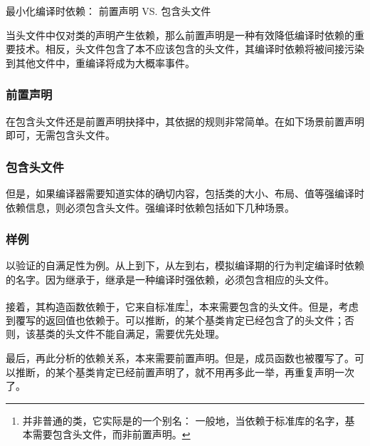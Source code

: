 \begin{content}
\begin{episode}{最小化编译时依赖： 前置声明 VS. 包含头文件}
\begin{content}
当头文件中仅对类的声明产生依赖，那么前置声明是一种有效降低编译时依赖的重要技术。相反，头文件包含了本不应该包含的头文件，其编译时依赖将被间接污染到其他文件中，重编译将成为大概率事件。

\subsubsection{前置声明}

在包含头文件还是前置声明抉择中，其依据的规则非常简单。在如下场景前置声明即可，无需包含头文件。

\begin{enum}
\end{enum}

\subsubsection{包含头文件}

但是，如果编译器需要知道实体的确切内容，包括类的大小、布局、值等强编译时依赖信息，则必须包含头文件。强编译时依赖包括如下几种场景。

\begin{enum}
\end{enum}

\subsubsection{样例}

以验证的自满足性为例。从上到下，从左到右，模拟编译期的行为判定编译时依赖的名字。因为继承于，继承是一种编译时强依赖，必须包含相应的头文件。

接着，其构造函数依赖于，它来自标准库\footnote{并非普通的类，它实际是的一个别名： 一般地，当依赖于标准库的名字，基本需要包含头文件，而非前置声明。}，本来需要包含的头文件。但是，考虑到覆写的返回值也依赖于。可以推断，的某个基类肯定已经包含了的头文件；否则，该基类的头文件不能自满足，需要优先处理。

最后，再此分析的依赖关系，本来需要前置声明。但是，成员函数也被覆写了。可以推断，的某个基类肯定已经前置声明了，就不用再多此一举，再重复声明一次了。


\end{content}
\end{episode}
\end{content}
